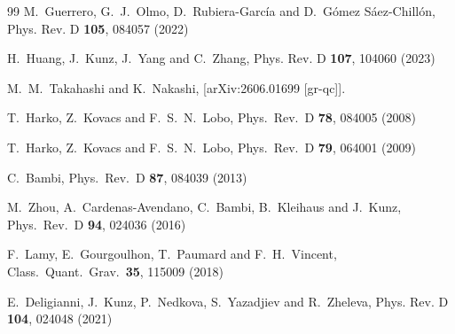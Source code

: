 \documentclass[11pt,a4paper]{article}
\begin{document}
\begin{thebibliography}{99}
M.~Guerrero, G.~J.~Olmo, D.~Rubiera-Garc\'ia and D.~G\'omez S\'aez-Chill\'on,
Phys. Rev. D \textbf{105}, 084057 (2022)


H.~Huang, J.~Kunz, J.~Yang and C.~Zhang,
Phys. Rev. D \textbf{107}, 104060 (2023)



M.~M.~Takahashi and K.~Nakashi,
[arXiv:2606.01699 [gr-qc]].



  T.~Harko, Z.~Kovacs and F.~S.~N.~Lobo,
  Phys.\ Rev.\ D {\bf 78}, 084005 (2008)

  T.~Harko, Z.~Kovacs and F.~S.~N.~Lobo,
  Phys.\ Rev.\ D {\bf 79}, 064001 (2009)

  C.~Bambi,
  Phys.\ Rev.\ D {\bf 87}, 084039 (2013)

  M.~Zhou, A.~Cardenas-Avendano, C.~Bambi, B.~Kleihaus and J.~Kunz,
  Phys.\ Rev.\ D {\bf 94}, 024036 (2016)

  F.~Lamy, E.~Gourgoulhon, T.~Paumard and F.~H.~Vincent,
  Class.\ Quant.\ Grav.\  {\bf 35},   115009 (2018)

E.~Deligianni, J.~Kunz, P.~Nedkova, S.~Yazadjiev and R.~Zheleva,
Phys. Rev. D \textbf{104},  024048 (2021)


\end{thebibliography}
\end{document}
